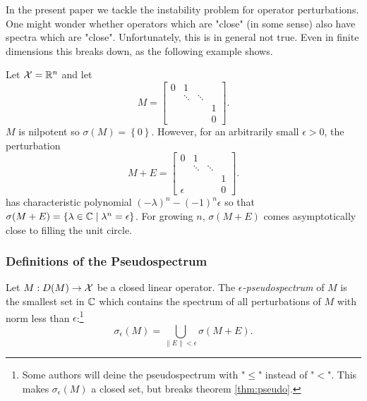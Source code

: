 In the present paper we tackle the instability problem for operator perturbations. 
One might wonder whether operators which are "close" (in some sense) also have spectra 
which are "close". Unfortunately, this is in general not true. Even in finite dimensions 
this breaks down, as the following example shows. 

\begin{example}
    \label{ex:spec_unstable}
    Let $\mathcal{X} = \mathbb{R}^n$ and let 
    \begin{equation}
        M = \begin{bmatrix}
            0 &   1    &        &   \\
              & \ddots & \ddots &   \\
              &        &        & 1 \\
              &        &        & 0
        \end{bmatrix} . 
    \end{equation}
    $M$ is nilpotent so $\sigma (M) = \left\{ 0 \right\}$. However, for an arbitrarily 
    small $\epsilon > 0$, the perturbation
    \begin{equation}
        M + E = \begin{bmatrix}
            0        &   1    &        &   \\
                        & \ddots & \ddots &   \\
                        &        &        & 1 \\
            \epsilon &        &        & 0
        \end{bmatrix} . 
    \end{equation}
    has characteristic polynomial $(-\lambda)^n - (-1)^n \epsilon$ so that 
    $\sigma (M + E) = \left\{ \lambda \in \mathbb{C} \mid \lambda^n = \epsilon \right\}$. 
    For growing $n$, $\sigma (M + E)$ comes asymptotically close to filling the 
    unit circle. 
\end{example}


\subsubsection{Definitions of the Pseudospectrum}

\begin{definition}
    Let $M : D(M) \to \mathcal{X}$ be a closed linear operator. The 
    \emph{$\epsilon$-pseudospectrum} of $M$ is 
    the smallest set in $\mathbb{C}$ which contains the spectrum of all perturbations of $M$ 
    with norm less than $\epsilon$:\footnote{
        Some authors will deine the pseudospectrum with "$\leq$" instead of "$<$". This 
        makes $\sigma_\epsilon (M)$ a closed set, but breaks theorem \ref{thm:pseudo}.}
    \begin{equation}
        \label{eq:pseudospectrum_union}
        \sigma_\epsilon (M) = \bigcup_{\| E \| < \epsilon} \sigma (M + E). 
    \end{equation}
\end{definition}

